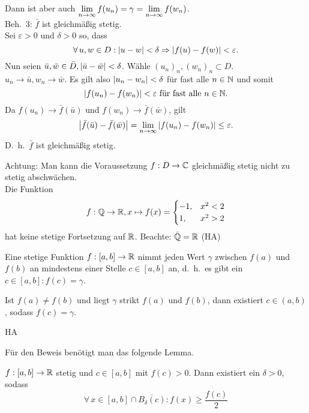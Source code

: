 \documentclass[../ana1.tex]{subfiles}
\begin{document}
\begin{bew}
    Dann ist aber auch \( \lim\limits_{n\rightarrow\infty} f(u_n) = \gamma 
    = \lim\limits_{n\rightarrow\infty}f(w_n) \).\\
    Beh.\ 3: \( \bar{f} \) ist gleichmäßig stetig.\\
    Sei \( \varepsilon > 0 \) und \( \delta > 0 \) so, 
    dass 
    \[ \forall \, u,w\in D : \left|u-w\right| < \delta 
    \Rightarrow \left|f(u)-f(w)\right| < \varepsilon. \]
    Nun seien \( \bar{u}, \bar{w} \in \bar{D}, 
    \left|\bar{u} - \bar{w}\right| < \delta \). Wähle 
    \( {(u_n)}_n, {(w_n)}_n \subset D \).\\
    \( u_n \rightarrow \bar{u}, w_n \rightarrow \bar{w} \). 
    Es gilt also \( \left|u_n - w_n\right| < \delta \) für 
    fast alle \( n\in\mathbb{N} \) und somit
    \[ \left|f(u_n) - f(w_n)\right| < \varepsilon 
    \text{ für fast alle } n\in\mathbb{N}. \]
    Da \( f(u_n) \rightarrow \bar{f}(\bar{u}) \) und 
    \( f(w_n) \rightarrow \bar{f}(\bar{w}) \), gilt
    \[ \left| \bar{f}(\bar{u}) - \bar{f}(\bar{w}) \right| 
    = \lim\limits_{n\rightarrow\infty} \left| f(u_n) - f(w_n) \right| \leq \varepsilon. \]
    D.\ h.\  \( \bar{f} \) ist gleichmäßig stetig.
\end{bew}
Achtung: Man kann die Voraussetzung 
\( f: D\rightarrow \mathbb{C} \) gleichmäßig stetig nicht zu 
stetig abschwächen.\\
Die Funktion 
\[ f: \mathbb{Q} \rightarrow \mathbb{R}, x \mapsto f(x) = 
\begin{cases}
    -1, &x^2 < 2\\
    1, &x^2 > 2
\end{cases} \]
hat keine stetige Fortsetzung auf \( \mathbb{R} \).
Beachte: \( \bar{\mathbb{Q}} = \mathbb{R} \) (HA)
\begin{satz}[Zwischenwertsatz]
    Eine stetige Funktion \( f: [a,b] \rightarrow \mathbb{R} \) 
    nimmt jeden Wert \( \gamma \) zwischen \( f(a) \) 
    und \( f(b) \) an mindestens einer Stelle 
    \( c\in [a,b] \) an, d.\ h.\ es gibt ein 
    \( c \in [a,b] : f(c) = \gamma \).
\end{satz}
\begin{bem}
    Ist \( f(a) \neq f(b) \) und liegt \( \gamma \) strikt 
    \( f(a) \) und \( f(b) \), dann existiert 
    \( c \in (a,b) \), sodass \( f(c) = \gamma \).
\end{bem}
\begin{bew}
    HA
\end{bew}
Für den Beweis benötigt man das folgende Lemma.
\begin{lem}
    \( f: [a,b] \rightarrow \mathbb{R} \) stetig und 
    \( c \in [a,b] \) mit \( f(c) > 0 \). Dann existiert 
    ein \( \delta > 0 \), sodass 
    \[ \forall \, x\in [a,b] \cap \overline{B_\delta(c)} : 
    f(x) \geq \frac{f(c)}{2} \]
\end{lem}
\end{document}
